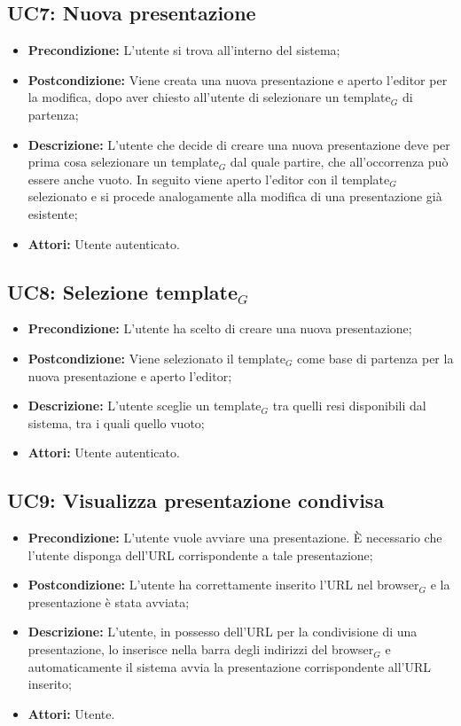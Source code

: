 \subsection{ UC7: Nuova presentazione}

\begin{itemize}
	\item \textbf{Precondizione:} L’utente si trova all’interno del sistema;
	\item \textbf{Postcondizione:} Viene creata una nuova presentazione e aperto l’editor per la modifica, dopo aver chiesto all’utente di selezionare un template$_G$ di partenza;
	\item \textbf{Descrizione:} L’utente che decide di creare una nuova presentazione deve per prima cosa selezionare un template$_G$ dal quale partire, che all’occorrenza può essere anche vuoto. In seguito viene aperto l’editor con il template$_G$ selezionato e si procede analogamente alla modifica di una presentazione già esistente;
	\item \textbf{Attori:} Utente autenticato.
\end{itemize}
\subsection{ UC8: Selezione template$_G$}

\begin{itemize}
	\item \textbf{Precondizione:} L’utente ha scelto di creare una nuova presentazione;
	\item \textbf{Postcondizione:} Viene selezionato il template$_G$ come base di partenza per la nuova presentazione e aperto l’editor;
	\item \textbf{Descrizione:} L’utente sceglie un template$_G$ tra quelli resi disponibili dal sistema, tra i quali quello vuoto;
	\item \textbf{Attori:} Utente autenticato.
\end{itemize}
\subsection{ UC9: Visualizza presentazione condivisa}

\begin{itemize}
	\item \textbf{Precondizione:} L’utente vuole avviare una presentazione. È necessario che l’utente disponga dell'URL corrispondente a tale presentazione;
	\item \textbf{Postcondizione:} L’utente ha correttamente inserito l'URL nel browser$_G$ e la presentazione è stata avviata;
	\item \textbf{Descrizione:} L’utente, in possesso dell'URL per la condivisione di una presentazione, lo inserisce nella barra degli indirizzi del browser$_G$ e automaticamente il sistema avvia la presentazione corrispondente all'URL inserito;
	\item \textbf{Attori:} Utente.
\end{itemize}